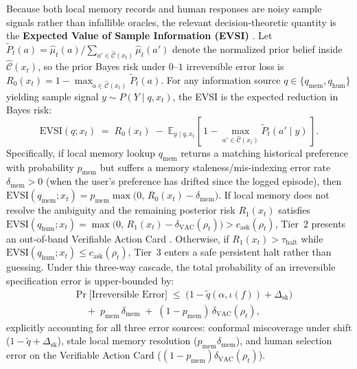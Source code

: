 \documentclass[11pt]{article}
\begin{document}
Because both local memory records and human responses are noisy sample signals rather than infallible oracles, the relevant decision-theoretic quantity is the \textbf{Expected Value of Sample Information (EVSI)} \citep{zhang2024clarify, armin2026rescue}. Let $\tilde{P}_t(a) = \hat{\mu}_t(a) / \sum_{a' \in \hat{\mathcal{C}}(x_t)} \hat{\mu}_t(a')$ denote the normalized prior belief inside $\hat{\mathcal{C}}(x_t)$, so the prior Bayes risk under $0$--$1$ irreversible error loss is $R_0(x_t) = 1 - \max_{a \in \hat{\mathcal{C}}(x_t)} \tilde{P}_t(a)$. For any information source $q \in \{q_{\mathrm{mem}},\allowbreak q_{\mathrm{hum}}\}$ yielding sample signal $y \sim P(Y \mid q,\allowbreak x_t)$, the EVSI is the expected reduction in Bayes risk:
\begin{equation}
\mathrm{EVSI}(q; x_t) \;=\; R_0(x_t) \;-\; \mathbb{E}_{y \mid q, x_t}\!\left[\, 1 - \max_{a' \in \hat{\mathcal{C}}(x_t)} \tilde{P}_t(a' \mid y) \,\right].
\label{eq:evsi}
\end{equation}
Specifically, if local memory lookup $q_{\mathrm{mem}}$ returns a matching historical preference with probability $p_{\mathrm{mem}}$ but suffers a memory staleness/mis-indexing error rate $\delta_{\mathrm{mem}} > 0$ (when the user's preference has drifted since the logged episode), then $\mathrm{EVSI}(q_{\mathrm{mem}};\allowbreak x_t) = p_{\mathrm{mem}} \max\bigl(0,\allowbreak \, R_0(x_t) - \delta_{\mathrm{mem}}\bigr)$. If local memory does not resolve the ambiguity and the remaining posterior risk $R_1(x_t)$ satisfies $\mathrm{EVSI}(q_{\mathrm{hum}};\allowbreak x_t) = \max\bigl(0,\allowbreak \, R_1(x_t) - \delta_{\mathrm{VAC}}(\rho_t)\bigr) > c_{\mathrm{ask}}(\rho_t)$, Tier~2 presents an out-of-band Verifiable Action Card \citep{breckenridge2026ihitl}. Otherwise, if $R_1(x_t) > \tau_{\mathrm{halt}}$ while $\mathrm{EVSI}(q_{\mathrm{hum}};\allowbreak x_t) \le c_{\mathrm{ask}}(\rho_t)$, Tier~3 enters a safe persistent halt rather than guessing. Under this three-way cascade, the total probability of an irreversible specification error is upper-bounded by:
\begin{equation}
\begin{aligned}
&\Pr\bigl[\text{Irreversible Error}\bigr] \;\le\; \bigl(1 - \tilde{q}(\alpha, \iota(f)) + \Delta_{\mathrm{sk}}\bigr) \\
&\quad \;+\; p_{\mathrm{mem}}\,\delta_{\mathrm{mem}} \;+\; (1 - p_{\mathrm{mem}})\,\delta_{\mathrm{VAC}}(\rho_t),
\end{aligned}
\label{eq:error_bound}
\end{equation}
explicitly accounting for all three error sources: conformal miscoverage under shift ($1 - \tilde{q} + \Delta_{\mathrm{sk}}$), stale local memory resolution ($p_{\mathrm{mem}}\delta_{\mathrm{mem}}$), and human selection error on the Verifiable Action Card ($(1-p_{\mathrm{mem}})\delta_{\mathrm{VAC}}(\rho_t)$).
\end{document}

